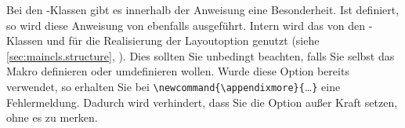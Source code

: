 \begin{Declaration}
\end{Declaration}%
Bei den {\KOMAScript}-Klassen gibt es innerhalb der Anweisung
%
 eine
Besonderheit. Ist  definiert, so wird diese Anweisung von
 ebenfalls ausgeführt. Intern wird das von den
{\KOMAScript}-Klassen  und  für die Realisierung der Layoutoption
 genutzt (siehe
\autoref{sec:maincls.structure},
). Dies  sollten
Sie unbedingt beachten, falls Sie selbst das Makro 
definieren oder umdefinieren wollen. Wurde diese Option bereits verwendet, so
erhalten Sie bei \verb|\newcommand{\appendixmore}{|\dots\verb|}| eine
Fehlermeldung.  Dadurch wird verhindert, dass Sie die Option außer
Kraft setzen, ohne es zu merken.

